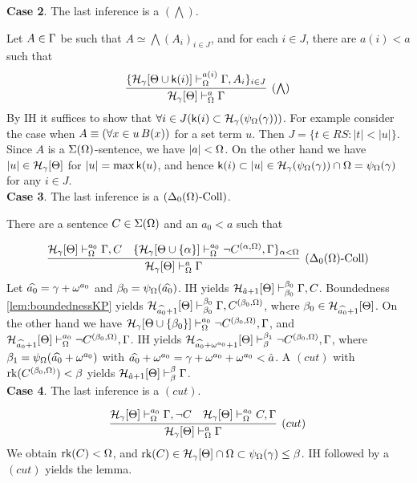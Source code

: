 \documentclass{article}
\begin{document}
\noindent
{\bf Case 2}. The last inference is a $(\bigwedge)$.

Let $A\in\Gamma$ be such that $A\simeq\bigwedge(A_{i})_{i\in J}$, and for each $i\in J$,
there are 
$a(i)<a$ such that 
\[
\infer[(\bigwedge)]{\calh_{\gam}[\Tht]\vdash^{a}_{\Ome}\Gam}
{
\{
\calh_{\gam}[\Tht\cup\sfk(i)]\vdash^{a(i)}_{\Ome}\Gam,A_{i}
\}_{i\in J}
}
\]
By IH it suffices to show that $\forall i\in J({\sf k}(i)\subset{\cal H}_{\gamma}(\psi_{\Omega}(\gamma)))$.
For example consider the case when $A\equiv(\forall x\in u\, B(x))$ for a set term $u$.
Then $J=\{t\in RS: |t|<|u|\}$.
Since $A$ is a $\Sigma(\Omega)$-sentence, we have $|a|<\Omega$.
On the other hand we have $|u|\in{\cal H}_{\gamma}[\Theta]$ for $|u|=\max {\sf k}(u)$, and hence
${\sf k}(i)\subset |u|\in{\cal H}_{\gamma}(\psi_{\Omega}(\gamma))\cap\Omega=\psi_{\Omega}(\gamma)$
for any $i\in J$.
\\

\noindent
{\bf Case 3}. The last inference is a $(\Delta_{0}(\Omega)\mbox{{\rm -Coll}})$.

There are a sentence $C\in\Sigma(\Omega)$ and an
$a_{0}<a$ such that

\[
\infer[(\Del_{0}(\Ome)\mbox{{\rm -Coll}})]{\calh_{\gam}[\Tht]\vdash^{a}_{\Ome}\Gamma}
{
\calh_{\gam}[\Tht]\vdash^{a_{0}}_{\Ome}\Gamma, C
&
\{
\calh_{\gam}[\Tht\cup\{\alp\}]\vdash^{a_{0}}_{\Ome} \lnot C^{(\alp,\Ome)}, \Gam
\}_{\alp<\Ome}
}
\]
Let $\widehat{a_{0}}=\gamma+\omega^{a_{0}}$ and $\beta_{0}=\psi_{\Omega}(\widehat{a_{0}})$.
IH yields 
${\cal H}_{\hat{a}+1}[\Theta]\vdash^{\beta_{0}}_{\beta_{0}}\Gamma,C$.
Boundedness \ref{lem:boundednessKP} yields
${\cal H}_{\widehat{a_{0}}+1}[\Theta]\vdash^{\beta_{0}}_{\beta_{0}}\Gamma,C^{(\beta_{0},\Omega)}$,
where $\beta_{0}\in{\cal H}_{\widehat{a_{0}}+1}[\Theta]$.
On the other hand we have 
${\cal H}_{\gamma}[\Theta\cup\{\beta_{0}\}]\vdash^{a_{0}}_{\Omega} \lnot C^{(\beta_{0},\Omega)}, \Gamma$,
and 
${\cal H}_{\widehat{a_{0}}+1}[\Theta]\vdash^{a_{0}}_{\Omega} \lnot C^{(\beta_{0},\Omega)}, \Gamma$.
IH yields
${\cal H}_{\widehat{a_{0}}+\omega^{a_{0}}+1}[\Theta]\vdash^{\beta_{1}}_{\beta} \lnot C^{(\beta_{0},\Omega)}, \Gamma$,
where
$\beta_{1}=\psi_{\Omega}(\widehat{a_{0}}+\omega^{a_{0}})$ with
$\widehat{a_{0}}+\omega^{a_{0}}=\gamma+\omega^{a_{0}}+\omega^{a_{0}}<\hat{a}$.
A $(cut)$ with $\mbox{{\rm rk}}(C^{(\beta_{0},\Omega)})<\beta$ yields
${\cal H}_{\hat{a}+1}[\Theta]\vdash^{\beta}_{\beta}\Gamma$.
\\

\noindent
{\bf Case 4}. The last inference is a $(cut)$.

\[
\infer[(cut)]{\calh_{\gam}[\Tht]\vdash^{a}_{\Ome}\Gam}
{
\calh_{\gam}[\Tht]\vdash^{a_{0}}_{\Ome}\Gam,\lnot C 
& 
\calh_{\gam}[\Tht]\vdash^{a_{0}}_{\Ome}C,\Gam
}
\]
We obtain $\mbox{{\rm rk}}(C)<\Omega$, and $\mbox{{\rm rk}}(C)\in{\cal H}_{\gamma}[\Theta]\cap\Omega\subset\psi_{\Omega}(\gamma)\leq\beta$.
IH followed by a $(cut)$ yields the lemma.
\eprf
\end{document}
